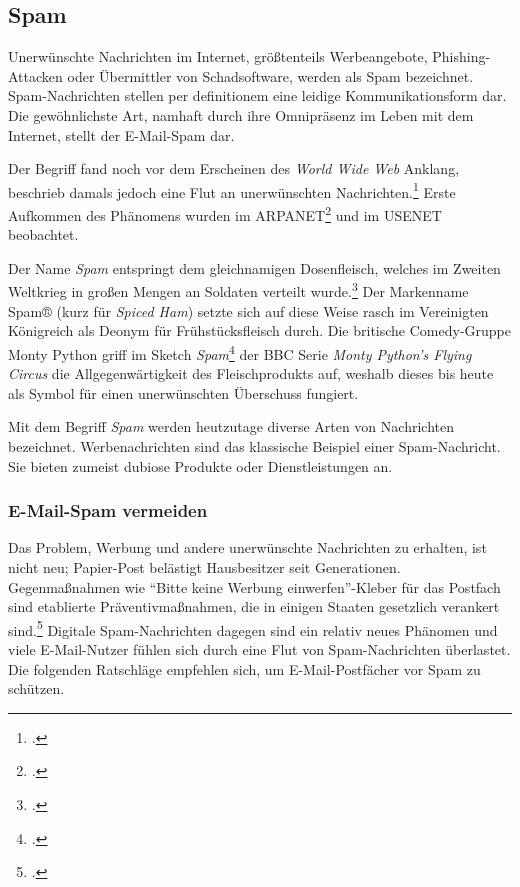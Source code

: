 \subsection{Spam} %
\label{sub:spam}
Unerwünschte Nachrichten im Internet, größtenteils Werbeangebote,
Phishing-Attacken oder Übermittler von Schadsoftware, werden als Spam
bezeichnet. Spam-Nachrichten stellen per definitionem eine leidige
Kommunikationsform dar. Die gewöhnlichste Art, namhaft durch ihre Omnipräsenz
im Leben mit dem Internet, stellt der E-Mail-Spam dar.

Der Begriff fand noch vor dem Erscheinen des \emph{World Wide Web} Anklang,
beschrieb damals jedoch eine Flut an unerwünschten
Nachrichten.\footcite{originTermSpam} Erste Aufkommen des Phänomens wurden im
ARPANET\footcite{rfc:706} und im USENET beobachtet.

Der Name \emph{Spam} entspringt dem gleichnamigen Dosenfleisch, welches im
Zweiten Weltkrieg in großen Mengen an Soldaten verteilt
wurde.\footcite{lifeDuringSecondWW} Der Markenname Spam® (kurz für \emph{Spiced
Ham}) setzte sich auf diese Weise rasch im Vereinigten Königreich als Deonym
für Frühstücksfleisch durch. Die britische Comedy-Gruppe Monty Python griff im
Sketch \emph{Spam}\footcite{spamMontyPython} der BBC Serie \emph{Monty Python’s
Flying Circus} die Allgegenwärtigkeit des Fleischprodukts auf, weshalb dieses
bis heute als Symbol für einen unerwünschten Überschuss fungiert.

Mit dem Begriff \emph{Spam} werden heutzutage diverse Arten von Nachrichten
bezeichnet. Werbenachrichten sind das klassische Beispiel einer Spam-Nachricht.
Sie bieten zumeist dubiose Produkte oder Dienstleistungen an.

\subsubsection{E-Mail-Spam vermeiden}
\label{ssub:e-mail-spam-vermeiden}

Das Problem, Werbung und andere unerwünschte Nachrichten zu erhalten, ist nicht
neu; Papier-Post belästigt Hausbesitzer seit Generationen. Gegenmaßnahmen wie
\enquote{Bitte keine Werbung einwerfen}-Kleber für das Postfach sind etablierte
Präventivmaßnahmen, die in einigen Staaten gesetzlich verankert
sind.\footcite{someReklameIllegal} Digitale Spam-Nachrichten dagegen sind ein
relativ neues Phänomen und viele E-Mail-Nutzer fühlen sich durch eine Flut von
Spam-Nachrichten überlastet. Die folgenden Ratschläge empfehlen sich, um
E-Mail-Postfächer vor Spam zu schützen.


